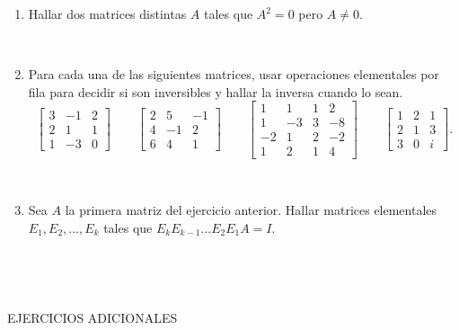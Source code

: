 \documentclass[11pt,spanish,makeidx]{amsbook}
\begin{document}
\begin{enumerate}
\item Hallar dos matrices distintas $A$ tales que $A^2=0$ pero $A\ne 0$.

\

\item Para cada una de las siguientes matrices, usar operaciones elementales
por fila para decidir si son inversibles y hallar la inversa cuando lo sean.
\begin{equation*}
\begin{bmatrix} 3 & -1 & 2 \\ 2 & 1 & 1 \\ 1 & -3 & 0\end{bmatrix}\qquad
\begin{bmatrix} 2 & 5 & -1 \\ 4 & -1 & 2 \\ 6 & 4 & 1\end{bmatrix}\qquad
\begin{bmatrix} 1 & 1 & 1 & 2 \\ 1 & -3 & 3 & -8 \\ -2 & 1 & 2 & -2 \\ 1 & 2 & 1 & 4 \end{bmatrix}\qquad
\begin{bmatrix} 1 & 2 & 1 \\ 2 & 1 & 3 \\ 3 & 0 & i \end{bmatrix}.
\end{equation*}

\

\item Sea $A$ la primera matriz del ejercicio anterior.
Hallar matrices elementales $E_1,E_2,\dots,E_k$ tales que $E_kE_{k-1}\dots E_2E_1A=I$.

\


\




\end{enumerate}




\medskip
\centerline{EJERCICIOS ADICIONALES}
\medskip
\vspace{.5cm}
\end{document}
